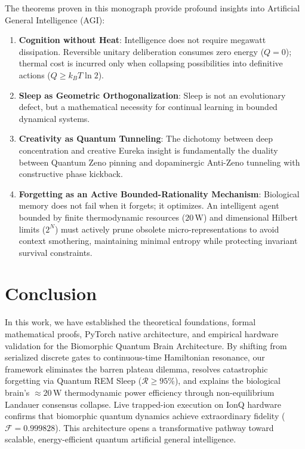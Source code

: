 \documentclass[10pt,twocolumn,3p]{article}
\begin{document}
The theorems proven in this monograph provide profound insights into Artificial General Intelligence (AGI):
\begin{enumerate}
    \item \textbf{Cognition without Heat}: Intelligence does not require megawatt dissipation. Reversible unitary deliberation consumes zero energy ($Q = 0$); thermal cost is incurred only when collapsing possibilities into definitive actions ($Q \ge k_B T \ln 2$).
    \item \textbf{Sleep as Geometric Orthogonalization}: Sleep is not an evolutionary defect, but a mathematical necessity for continual learning in bounded dynamical systems.
    \item \textbf{Creativity as Quantum Tunneling}: The dichotomy between deep concentration and creative Eureka insight is fundamentally the duality between Quantum Zeno pinning and dopaminergic Anti-Zeno tunneling with constructive phase kickback.
    \item \textbf{Forgetting as an Active Bounded-Rationality Mechanism}: Biological memory does not fail when it forgets; it optimizes. An intelligent agent bounded by finite thermodynamic resources ($20\,\text{W}$) and dimensional Hilbert limits ($2^N$) must actively prune obsolete micro-representations to avoid context smothering, maintaining minimal entropy while protecting invariant survival constraints.
\end{enumerate}

\section{Conclusion}
\label{sec:conclusion}

In this work, we have established the theoretical foundations, formal mathematical proofs, PyTorch native architecture, and empirical hardware validation for the Biomorphic Quantum Brain Architecture. By shifting from serialized discrete gates to continuous-time Hamiltonian resonance, our framework eliminates the barren plateau dilemma, resolves catastrophic forgetting via Quantum REM Sleep ($\mathcal{R} \ge 95\%$), and explains the biological brain's $\approx 20\,\text{W}$ thermodynamic power efficiency through non-equilibrium Landauer consensus collapse. Live trapped-ion execution on IonQ hardware confirms that biomorphic quantum dynamics achieve extraordinary fidelity ($\mathcal{F} = 0.999828$). This architecture opens a transformative pathway toward scalable, energy-efficient quantum artificial general intelligence.
\end{document}
